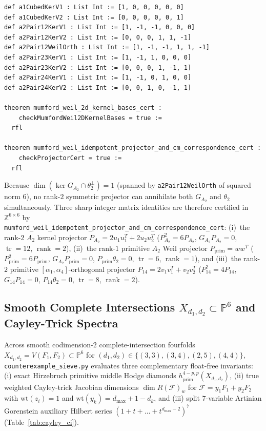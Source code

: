 \documentclass[11pt,a4paper]{article}
\begin{document}
\begin{lstlisting}[caption={Explicit $2$-dimensional $A_1^3$ and $A_2$ kernel bases in \texttt{MumfordWeilKernelVecs.lean}.}]
def a1CubedKerV1 : List Int := [1, 0, 0, 0, 0, 0]
def a1CubedKerV2 : List Int := [0, 0, 0, 0, 0, 1]
def a2Pair12KerV1 : List Int := [1, -1, -1, 0, 0, 0]
def a2Pair12KerV2 : List Int := [0, 0, 0, 1, 1, -1]
def a2Pair12WeilOrth : List Int := [1, -1, -1, 1, 1, -1]
def a2Pair23KerV1 : List Int := [1, -1, 1, 0, 0, 0]
def a2Pair23KerV2 : List Int := [0, 0, 0, 1, -1, 1]
def a2Pair24KerV1 : List Int := [1, -1, 0, 1, 0, 0]
def a2Pair24KerV2 : List Int := [0, 0, 1, 0, -1, 1]

theorem mumford_weil_2d_kernel_bases_cert :
    checkMumfordWeil2DKernelBases = true :=
  rfl

theorem mumford_weil_idempotent_projector_and_cm_correspondence_cert :
    checkProjectorCert = true :=
  rfl
\end{lstlisting}

Because $\dim(\ker G_{A_2} \cap \theta_2^\perp) = 1$ (spanned by \texttt{a2Pair12WeilOrth} of squared norm $6$), no rank-$2$ symmetric projector can annihilate both $G_{A_2}$ and $\theta_2$ simultaneously. Three sharp integer matrix identities are therefore certified in $\mathbb{Z}^{6 \times 6}$ by\\
{\small\texttt{mumford\_weil\_idempotent\_projector\_and\_cm\_correspondence\_cert}}:
(i)~the rank-$2$ $A_2$ kernel projector $P_{A_2} = 2 u_1 u_1^T + 2 u_2 u_2^T$ ($P_{A_2}^2 = 6 P_{A_2}$, $G_{A_2} P_{A_2} = 0$, $\operatorname{tr} = 12$, $\operatorname{rank} = 2$), (ii)~the rank-$1$ primitive $A_2$ Weil projector $P_{\mathrm{prim}} = w w^T$ ($P_{\mathrm{prim}}^2 = 6 P_{\mathrm{prim}}$, $G_{A_2} P_{\mathrm{prim}} = 0$, $P_{\mathrm{prim}} \theta_2 = 0$, $\operatorname{tr} = 6$, $\operatorname{rank} = 1$), and (iii)~the rank-$2$ primitive $[\alpha_1, \alpha_4]$-orthogonal projector $P_{14} = 2 v_1 v_1^T + v_2 v_2^T$ ($P_{14}^2 = 4 P_{14}$, $G_{14} P_{14} = 0$, $P_{14} \theta_2 = 0$, $\operatorname{tr} = 8$, $\operatorname{rank} = 2$).

\subsection{Smooth Complete Intersections $X_{d_1,d_2} \subset \mathbb{P}^6$ and Cayley-Trick Spectra}

Across smooth codimension-$2$ complete-intersection fourfolds $X_{d_1, d_2} = V(F_1, F_2) \subset \mathbb{P}^6$ for $(d_1, d_2) \in \{(3,3), (3,4), (2,5), (4,4)\}$, \texttt{counterexample\_sieve.py} evaluates three complementary float-free invariants: (i) exact Hirzebruch primitive middle Hodge diamonds $h^{4-p, p}_{\mathrm{prim}}(X_{d_1, d_2})$, (ii) true weighted Cayley-trick Jacobian dimensions $\dim R(\mathcal{F})_w$ for $\mathcal{F} = y_1 F_1 + y_2 F_2$ with $\mathrm{wt}(z_i) = 1$ and $\mathrm{wt}(y_k) = d_{\max} + 1 - d_k$, and (iii) split $7$-variable Artinian Gorenstein auxiliary Hilbert series $(1 + t + \dots + t^{d_{\max}-2})^7$ (Table~\ref{tab:cayley_ci}).
\end{document}
